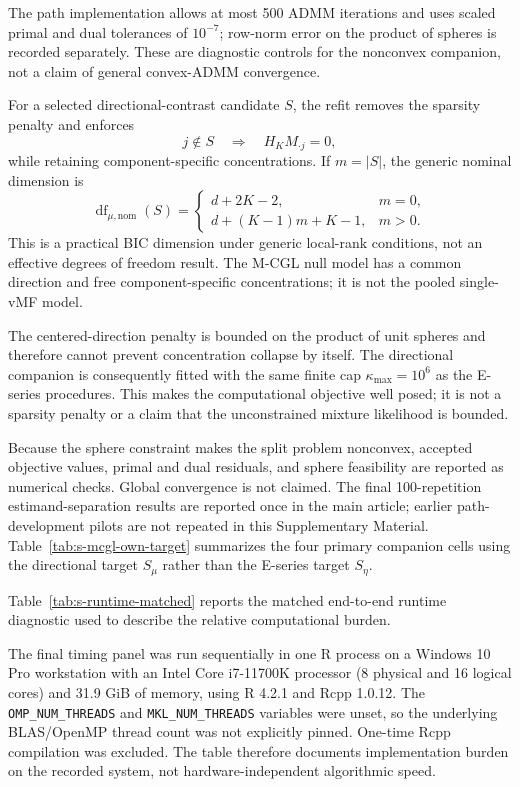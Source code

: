 \documentclass[preprint,12pt,authoryear]{elsarticle}
\begin{document}
The path implementation allows at most 500 ADMM iterations and uses scaled
primal and dual tolerances of $10^{-7}$; row-norm error on the product of
spheres is recorded separately. These are diagnostic controls for the
nonconvex companion, not a claim of general convex-ADMM convergence.

For a selected directional-contrast candidate $S$, the refit removes the
sparsity penalty and enforces
\[
j\notin S
\quad\Longrightarrow\quad
H_KM_{\cdot j}=0,
\]
while retaining component-specific concentrations. If $m=|S|$, the
generic nominal dimension is
\[
\operatorname{df}_{\mu,\mathrm{nom}}(S)
=
\begin{cases}
d+2K-2, & m=0,\\
d+(K-1)m+K-1, & m>0.
\end{cases}
\]
This is a practical BIC dimension under generic local-rank conditions, not an
effective degrees of freedom result. The M-CGL null model has a common
direction and free component-specific concentrations; it is not the pooled
single-vMF model.

The centered-direction penalty is bounded on the product of unit spheres and
therefore cannot prevent concentration collapse by itself. The directional
companion is consequently fitted with the same finite cap
$\kappa_{\max}=10^6$ as the E-series procedures.
This makes the computational objective well posed; it is not a sparsity
penalty or a claim that the unconstrained mixture likelihood is bounded.

Because the sphere constraint makes the split problem nonconvex, accepted
objective values, primal and dual residuals, and sphere feasibility are
reported as numerical checks. Global convergence is not claimed. The final
100-repetition estimand-separation results are reported once in the main
article; earlier path-development pilots are not repeated in this Supplementary Material.
Table~\ref{tab:s-mcgl-own-target} summarizes the four primary companion cells
using the directional target $S_\mu$ rather than the E-series target $S_\eta$.



Table~\ref{tab:s-runtime-matched} reports the matched end-to-end runtime
diagnostic used to describe the relative computational burden.

The final timing panel was run sequentially in one R process on a Windows 10
Pro workstation with an Intel Core i7-11700K processor (8 physical and 16
logical cores) and 31.9 GiB of memory, using R 4.2.1 and Rcpp 1.0.12. The
\texttt{OMP\_NUM\_THREADS} and \texttt{MKL\_NUM\_THREADS} variables were unset,
so the underlying BLAS/OpenMP thread count was not explicitly pinned. One-time
Rcpp compilation was excluded. The table therefore documents implementation
burden on the recorded system, not hardware-independent algorithmic speed.
\end{document}
